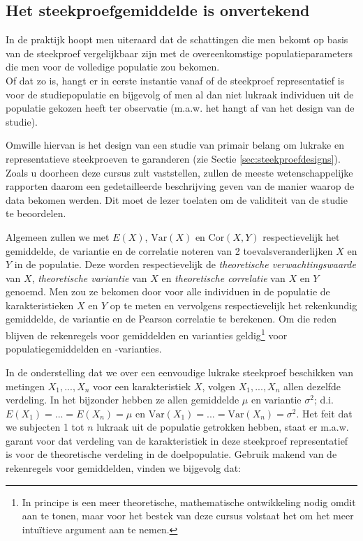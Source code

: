 \documentclass[
  12pt,dutch,coursenotes]{book}
\theoremstyle{definition}
\theoremstyle{definition}
\theoremstyle{definition}
\theoremstyle{definition}
\theoremstyle{remark}
\begin{document}
\hypertarget{het-steekproefgemiddelde-is-onvertekend}{%
\subsection{Het steekproefgemiddelde is onvertekend}\label{het-steekproefgemiddelde-is-onvertekend}}

In de praktijk hoopt men uiteraard dat de schattingen die men bekomt op basis van de steekproef vergelijkbaar zijn met de overeenkomstige populatieparameters die men voor de volledige populatie zou bekomen.\\
Of dat zo is, hangt er in eerste instantie vanaf of de steekproef representatief is voor de studiepopulatie en bijgevolg of men al dan niet lukraak individuen uit de populatie gekozen heeft ter observatie (m.a.w. het hangt af van het design van de studie).

Omwille hiervan is het design van een studie van primair belang om lukrake en representatieve steekproeven te garanderen (zie Sectie \ref{sec:steekproefdesigns}).
Zoals u doorheen deze cursus zult vaststellen, zullen de meeste wetenschappelijke rapporten daarom een gedetailleerde beschrijving geven van de manier waarop de data bekomen werden. Dit moet de lezer toelaten om de validiteit van de studie te beoordelen.

Algemeen zullen we met \(E(X)\), \(\text{Var}(X)\) en \(\text{Cor}(X,Y)\)
respectievelijk het gemiddelde, de variantie en de correlatie noteren van 2
toevalsveranderlijken \(X\) en \(Y\) in de populatie. Deze worden
respectievelijk de \emph{theoretische verwachtingswaarde} van \(X\), \emph{theoretische variantie} van \(X\) en \emph{theoretische correlatie} van \(X\) en \(Y\) genoemd.
Men zou ze bekomen door voor alle individuen in de populatie
de karakteristieken \(X\) en \(Y\) op te meten en vervolgens respectievelijk het
rekenkundig gemiddelde, de variantie en de Pearson correlatie te berekenen. Om die
reden blijven de rekenregels voor gemiddelden en varianties geldig\footnote{In principe is een meer theoretische, mathematische ontwikkeling nodig omdit aan te tonen, maar voor het bestek van deze cursus volstaat het om het
  meer intuïtieve argument aan te nemen.} voor populatiegemiddelden en
-varianties.

In de onderstelling dat we over een eenvoudige lukrake steekproef beschikken van metingen \(X_1,...,X_n\) voor een karakteristiek \(X\), volgen \(X_1,...,X_n\) allen dezelfde verdeling. In het
bijzonder hebben ze allen gemiddelde \(\mu\) en variantie \(\sigma^2\); d.i. \(E(X_1)=...=E(X_n)=\mu\) en \(\text{Var}(X_1)=...=\text{Var}(X_n)=\sigma^2\). Het feit
dat we subjecten 1 tot \(n\) lukraak uit de populatie getrokken hebben, staat
er m.a.w. garant voor dat verdeling van de karakteristiek in deze steekproef
representatief is voor de theoretische verdeling in de doelpopulatie.
Gebruik makend van de rekenregels voor gemiddelden, vinden we bijgevolg dat:
\end{document}
